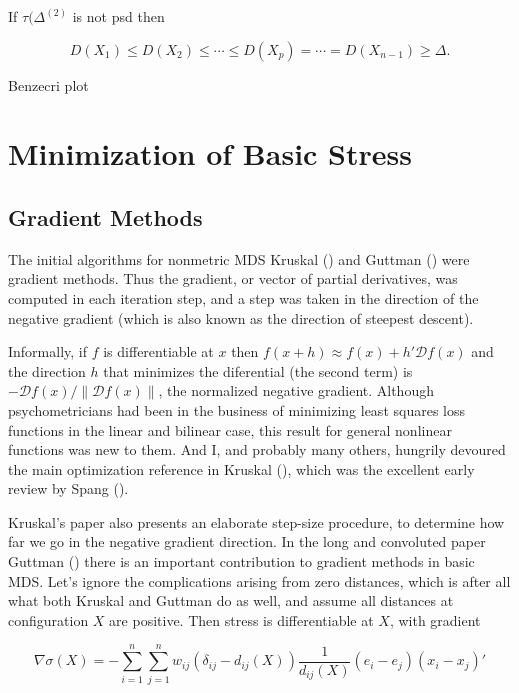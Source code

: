\documentclass[
  12pt,
  letterpaper,
  DIV=11,
  numbers=noendperiod]{scrreprt}
\theoremstyle{remark}
\begin{document}
If \(\tau(\Delta^{(2)}\) is not psd then

\[
D(X_1)\leq D(X_2)\leq\cdots\leq D(X_p)=\cdots=D(X_{n-1})\geq\Delta.
\]

Benzecri plot


\chapter{Minimization of Basic Stress}\label{minstr}

\section{Gradient Methods}\label{gradient-methods}

The initial algorithms for nonmetric MDS Kruskal
() and Guttman
() were gradient methods. Thus the
gradient, or vector of partial derivatives, was computed in each
iteration step, and a step was taken in the direction of the negative
gradient (which is also known as the direction of steepest descent).

Informally, if \(f\) is differentiable at \(x\) then
\(f(x+h)\approx f(x)+h'\mathcal{D}f(x)\) and the direction \(h\) that
minimizes the diferential (the second term) is
\(-\mathcal{D}f(x)/\|\mathcal{D}f(x)\|\), the normalized negative
gradient. Although psychometricians had been in the business of
minimizing least squares loss functions in the linear and bilinear case,
this result for general nonlinear functions was new to them. And I, and
probably many others, hungrily devoured the main optimization reference
in Kruskal (), which was the excellent
early review by Spang ().

Kruskal's paper also presents an elaborate step-size procedure, to
determine how far we go in the negative gradient direction. In the long
and convoluted paper Guttman () there is
an important contribution to gradient methods in basic MDS. Let's ignore
the complications arising from zero distances, which is after all what
both Kruskal and Guttman do as well, and assume all distances at
configuration \(X\) are positive. Then stress is differentiable at
\(X\), with gradient

\[
\nabla\sigma(X)=
-\sum_{i=1}^n\sum_{j=1}^nw_{ij}(\delta_{ij}-d_{ij}(X))\frac{1}{d_{ij}(X)}
(e_i-e_j)(x_i-x_j)'
\]
\end{document}
